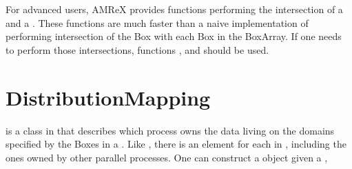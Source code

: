 \documentclass[letterpaper,10pt,english]{sphinxmanual}
\begin{document}
\begin{sphinxVerbatim}[commandchars=\\\{\}]
   
    
    
\end{sphinxVerbatim}

\sphinxAtStartPar
For advanced users, AMReX provides functions performing the intersection of a
 and a . These functions are much faster than a naive
implementation of performing intersection of the Box with each Box in the
BoxArray. If one needs to perform those intersections, functions
,  and
 should be used.


\section{DistributionMapping}
\label{\detokenize{Basics:distributionmapping}}\label{\detokenize{Basics:sec-basics-dm}}
\sphinxAtStartPar
{} is a class in  that
describes which process owns the data living on the domains specified by the
Boxes in a . Like , there is an element for each
 in , including the ones owned by other
parallel processes. One can construct a  object given
a ,

\begin{sphinxVerbatim}[commandchars=\\\{\}]
  
\end{sphinxVerbatim}
\end{document}
